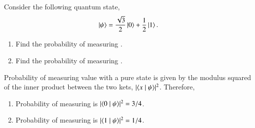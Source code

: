 \begin{exercise}
Consider the following quantum state,
    \begin{equation*}
        \left| \psi \right\rangle = \frac{\sqrt{3}}{2}\left| 0 \right\rangle + \frac{1}{2}\left| 1 \right\rangle.
    \end{equation*}
    \begin{enumerate}[label=(\alph*)]
        \item Find the probability of measuring .
        \item Find the probability of measuring .
    \end{enumerate}
\end{exercise}
\begin{solution}
Probability of measuring value  with a pure state \ket{\psi} is given by the modulus squared of the inner product between the two kets, $|\langle x \mid \psi \rangle|^2$. Therefore,
  \begin{enumerate}[label=(\alph*)]
    \item Probability of measuring  is $|\langle 0 \mid \psi \rangle|^2=3/4$.
    \item Probability of measuring  is $|\langle 1 \mid \psi \rangle|^2=1/4$.
  \end{enumerate}
\end{solution}

